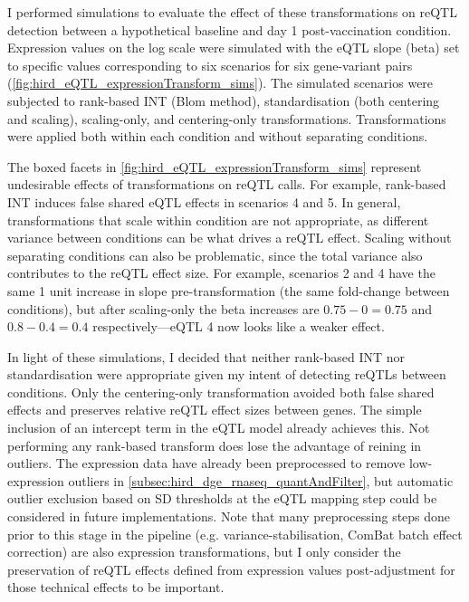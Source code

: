 I performed simulations to evaluate the effect of these transformations on reQTL detection between a hypothetical baseline and day 1 post-vaccination condition.
Expression values on the log scale were simulated with the \gls{eQTL} slope (beta) set to specific values corresponding to six scenarios for six gene-variant pairs (\autoref{fig:hird_eQTL_expressionTransform_sims}).
The simulated scenarios were subjected to rank-based \gls{INT} (Blom method\autocite{beasley2009RankBasedInverseNormal}), standardisation (both centering and scaling), scaling-only, and centering-only transformations.
Transformations were applied both within each condition and without separating conditions.

The boxed facets in \autoref{fig:hird_eQTL_expressionTransform_sims} represent undesirable effects of transformations on \gls{reQTL} calls.
For example, rank-based \gls{INT} induces false shared \gls{eQTL} effects in scenarios 4 and 5.
In general, transformations that scale within condition are not appropriate, as different variance between conditions can be what drives a \gls{reQTL} effect.
Scaling without separating conditions can also be problematic, since the total variance also contributes to the \gls{reQTL} effect size.
For example, scenarios 2 and 4 have the same 1 unit increase in slope pre-transformation (the same fold-change between conditions), 
but after scaling-only the beta increases are $0.75-0=0.75$ and $0.8-0.4=0.4$ respectively---eQTL 4 now looks like a weaker effect.

In light of these simulations, I decided that neither rank-based \gls{INT} nor standardisation were appropriate given my intent of detecting \glspl{reQTL} between conditions.
Only the centering-only transformation avoided both false shared effects and preserves relative \gls{reQTL} effect sizes between genes.
The simple inclusion of an intercept term in the \gls{eQTL} model already achieves this.
Not performing any rank-based transform does lose the advantage of reining in outliers.
The expression data have already been preprocessed to remove low-expression outliers in \autoref{subsec:hird_dge_rnaseq_quantAndFilter}, 
but automatic outlier exclusion based on \gls{SD} thresholds at the \gls{eQTL} mapping step could be considered in future implementations\autocite{vosa2018UnravelingPolygenicArchitecture}.
Note that many preprocessing steps done prior to this stage in the pipeline (e.g. variance-stabilisation, ComBat batch effect correction) are also expression transformations,
but I only consider the preservation of \gls{reQTL} effects defined from expression values post-adjustment for those technical effects to be important.

